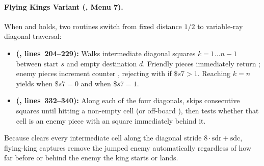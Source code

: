 \paragraph{Flying Kings Variant (, Menu 7).}
When  and  holds, two routines switch from fixed distance $1/2$ to variable-ray diagonal traversal:
\begin{itemize}
    \item \textbf{ (, lines~204--229):} Walks intermediate diagonal squares $k = 1 \dots n-1$ between start $s$ and empty destination $d$. Friendly pieces immediately return ; enemy pieces increment counter , rejecting with  if $\$s7 > 1$. Reaching $k = n$ yields  when $\$s7 = 0$ and  when $\$s7 = 1$.
    \item \textbf{ (, lines~332--340):} Along each of the four diagonals, skips consecutive  squares until hitting a non-empty cell (or off-board ), then tests whether that cell is an enemy piece with an  square immediately behind it.
\end{itemize}
Because  clears every intermediate cell along the diagonal stride $8\cdot\text{sdr} + \text{sdc}$, flying-king captures remove the jumped enemy automatically regardless of how far before or behind the enemy the king starts or lands.
